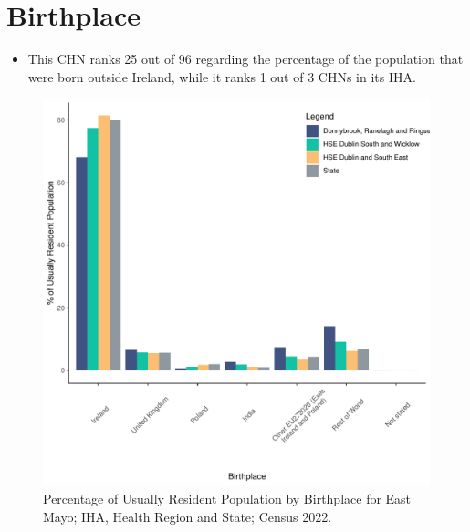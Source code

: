 \documentclass{article}
\begin{document}
\section{Birthplace}\label{sect:Birth}
\begin{itemize}
\item This CHN ranks  25 out of 96 regarding the percentage of the population that were born outside Ireland, while it ranks  1 out of 3 CHNs in its IHA.
\end{itemize}
\begin{figure}[H]
	\centering
	\includegraphics[width = 130mm]{../figures/BirthED.pdf}
	\caption{Percentage of Usually Resident Population by Birthplace for East Mayo; IHA, Health Region and State; Census 2022.}
	\label{fig:vbnv}
	\end{figure}
	
\end{document}
